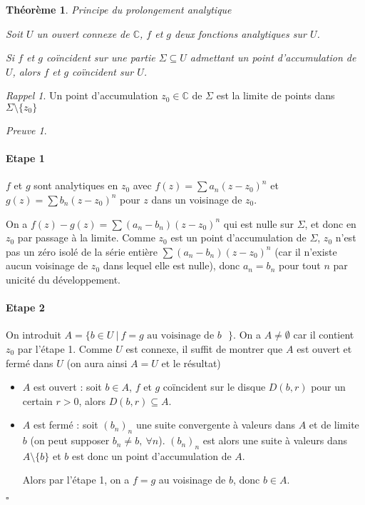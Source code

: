 \documentclass[]{article}
\newtheorem{mythm}{Théorème}
\theoremstyle{remark}
\newtheorem{myproof}{Preuve}
\newtheorem{myrapl}{Rappel}
\theoremstyle{definition}
\newcommand{\cqfd}{
	\hfill$\square$
}
\begin{document}
\begin{mythm}Principe du prolongement analytique
	
	Soit $U$ un ouvert connexe de $\mathbb{C}$, $f$ et $g$ deux fonctions analytiques sur $U$.
	
	Si $f$ et $g$ coïncident sur une partie $\Sigma \subseteq U$ admettant un point d'accumulation de $U$, alors $f$ et $g$ coïncident sur $U$.
\end{mythm}

\begin{myrapl}
	Un point d'accumulation $z_0 \in \mathbb{C}$ de $\Sigma$ est la limite de points dans $\Sigma \setminus \{z_0\}$
\end{myrapl}

\begin{myproof}
	\leavevmode
	\paragraph*{Etape 1}
	$f$ et $g$ sont analytiques en $z_0$ avec $f(z) = \sum a_n (z - z_0)^n$ et $g(z)=\sum b_n (z - z_0)^n$ pour $z$ dans un voisinage de $z_0$.
	
	On a $f(z) - g(z) = \sum (a_n - b_n) (z - z_0)^n$ qui est nulle sur $\Sigma$, et donc en $z_0$ par passage à la limite. Comme $z_0$ est un point d'accumulation de $\Sigma$, $z_0$ n'est pas un zéro isolé de la série entière $\sum (a_n - b_n) (z - z_0)^n$ (car il n'existe aucun voisinage de $z_0$ dans lequel elle est nulle), donc $a_n = b_n$ pour tout $n$ par unicité du développement.
	
	\paragraph{Etape 2} On introduit $A = \{b \in U ~ | ~ f = g \text{ au voisinage de $b$ }\}$. On a $A \neq \emptyset$ car il contient $z_0$ par l'étape 1. Comme $U$ est connexe, il suffit de montrer que $A$ est ouvert et fermé dans $U$ (on aura ainsi $A = U$ et le résultat)
	\begin{itemize}
		\item $A$ est ouvert : soit $b \in A$, $f$ et $g$ coïncident sur le disque $D(b, r)$ pour un certain $r > 0$, alors $D(b, r) \subseteq A$.
		\item $A$ est fermé : soit $(b_n)_n$ une suite convergente à valeurs dans $A$ et de limite $b$ (on peut supposer $b_n \neq b, ~ \forall n$). $(b_n)_n$ est alors une suite à valeurs dans $A \setminus \{b\}$ et $b$ est donc un point d'accumulation de $A$.
		
		Alors par l'étape 1, on a $f = g$ au voisinage de $b$, donc $b \in A$.
	\end{itemize}
	
	\cqfd
\end{myproof}
\end{document}
